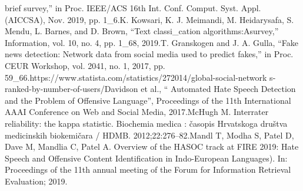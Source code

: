 \documentclass{letter}
\begin{document}
\begin{multicols}{2}
\begin{scriptsize}
brief survey,'' in Proc. IEEE/ACS 16th Int. Conf. Comput. Syst. 
Appl. (AICCSA), Nov. 2019, pp. 1\_6.\newline \newline
[26] K. Kowsari, K. J. Meimandi, M. Heidarysafa, S. Mendu, L. 
Barnes, and D. Brown, ``Text classi\_cation algorithms:Asurvey,'' 
Information, vol. 10, no. 4, pp. 1\_68, 2019.\newline \newline
[27] T. Granskogen and J. A. Gulla, ``Fake news detection: Network 
data from social media used to predict fakes,'' in Proc. CEUR 
Workshop, vol. 2041, no. 1, 2017, pp. 59\_66.\newline \newline
[28] https://www.statista.com/statistics/272014/global-social-network
s-ranked-by-number-of-users/\newline \newline
[29] Davidson et al., “ Automated Hate Speech Detection and the 
Problem of Offensive Language”, Proceedings of the 11th 
International AAAI Conference on Web and Social Media, 2017.\newline \newline
[30] McHugh M. Interrater reliability: the kappa statistic. Biochemia 
medica : časopis Hrvatskoga društva medicinskih biokemičara / 
HDMB. 2012;22:276–82.\newline \newline
[31] Mandl T, Modha S, Patel D, Dave M, Mandlia C, Patel A. 
Overview of the HASOC track at FIRE 2019: Hate Speech and 
Offensive Content Identification in Indo-European Languages). 
In: Proceedings of the 11th annual meeting of the Forum for 
Information Retrieval Evaluation; 2019.


\end{scriptsize}
\end{multicols}
\end{document}
